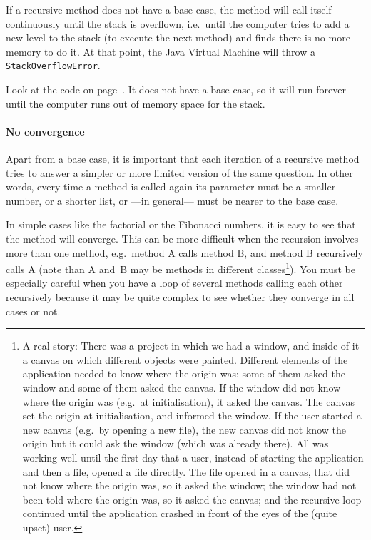 If a recursive method does not have a base case, the method will call
itself continuously until the stack is overflown, i.e.~until the
computer tries to add a new level to the stack (to execute the next
method) and finds there is no more memory to do it. At that point, the
Java Virtual Machine will throw a \verb+StackOverflowError+. 

Look at the code on page~\pageref{neverends}. It does not have a base
case, so it will run forever until the computer runs out of memory
space for the stack. 

\paragraph{No convergence}
\label{sec:no-convergence}

Apart from a base case, it is important that each iteration of a
recursive method tries to answer a simpler or more limited version of
the same question. In other words, every time a method is called again
its parameter must be a smaller number, or a shorter list, or ---in
general--- must be nearer to the base case. 

In simple cases like the factorial or the Fibonacci numbers, it is
easy to see that the method will converge. This can be more difficult
when the recursion involves more than one method, e.g.~method A calls
method B, and method B recursively calls A (note than A 
and~B may be methods in
different classes\footnote{A real story: There was a project in which
  we had a window, and inside of it a canvas on which different
  objects were painted. Different elements of the application needed
  to know where the origin was; some of them asked the window and some
  of them asked the canvas. If the window did not know where the
  origin was (e.g.~at initialisation), it asked the canvas. The canvas
  set the origin at initialisation, and informed the window. If the
  user started a new canvas (e.g.~by opening a new file), the new
  canvas did not know the origin but it could ask the window (which was
  already there). All was working well until the first day that a
  user, instead of starting the application and then a file, opened a
  file directly. The file opened in a canvas, that did not know where
  the origin was, so it asked the window; the window had not been told
  where the origin was, so it asked the canvas; and the recursive loop
  continued until the application crashed in front of the eyes of the
  (quite upset) user.}). You must be especially careful when you have
a loop of several methods calling each other recursively because it
may be quite complex to see whether they converge in all cases or not.


